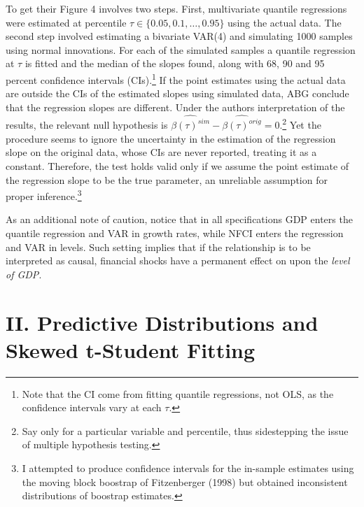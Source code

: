 \documentclass[
  11pt,
]{article}
\begin{document}
To get their Figure 4 involves two steps. First, multivariate quantile
regressions were estimated at percentile
\(\tau \in \{0.05, 0.1,\dots, 0.95\}\) using the actual data. The second
step involved estimating a bivariate VAR(4) and simulating 1000 samples
using normal innovations. For each of the simulated samples a quantile
regression at \(\tau\) is fitted and the median of the slopes found,
along with 68, 90 and 95 percent confidence intervals
(CIs).\footnote{Note that the CI come from fitting quantile regressions, not OLS, as the confidence intervals vary at each $\tau$.}
If the point estimates using the actual data are outside the CIs of the
estimated slopes using simulated data, ABG conclude that the regression
slopes are different. Under the authors interpretation of the results,
the relevant null hypothesis is
\(\widehat{\beta(\tau)^{sim}} - \widehat{\beta(\tau)^{orig}} = 0\).\footnote{Say only for a particular variable and percentile, thus sidestepping the issue of multiple hypothesis testing.}
Yet the procedure seems to ignore the uncertainty in the estimation of
the regression slope on the original data, whose CIs are never reported,
treating it as a constant. Therefore, the test holds valid only if we
assume the point estimate of the regression slope to be the true
parameter, an unreliable assumption for proper
inference.\footnote{I attempted to produce confidence intervals for the in-sample estimates using the moving block boostrap of Fitzenberger (1998) but obtained inconsistent distributions of boostrap estimates.}

As an additional note of caution, notice that in all specifications GDP
enters the quantile regression and VAR in growth rates, while NFCI
enters the regression and VAR in levels. Such setting implies that if
the relationship is to be interpreted as causal, financial shocks have a
permanent effect on upon the \textit{level of GDP}.

\hypertarget{ii.-predictive-distributions-and-skewed-t-student-fitting}{%
\section{II. Predictive Distributions and Skewed t-Student
Fitting}\label{ii.-predictive-distributions-and-skewed-t-student-fitting}}
\end{document}
